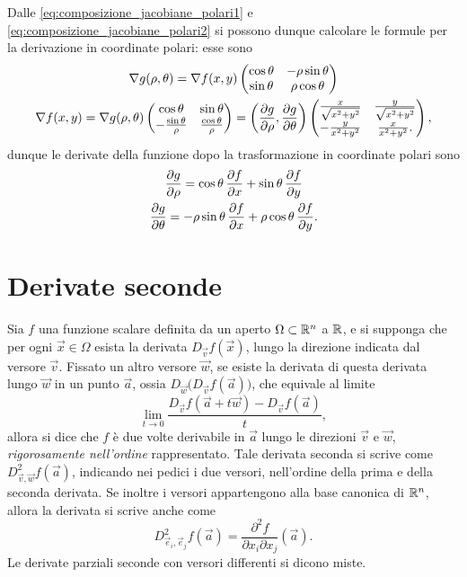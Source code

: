 Dalle \eqref{eq:composizione_jacobiane_polari1} e \eqref{eq:composizione_jacobiane_polari2} si possono dunque calcolare le formule per la derivazione in coordinate polari: esse sono
\begin{equation} \label{eq:jacobiane_polari}
\begin{gathered}
\nabla g(\rho,\theta)
=\nabla f(x,y)
	\begin{pmatrix}
	\cos\theta	&-\rho\sin\theta\\
	\sin\theta	&\rho\cos\theta
	\end{pmatrix}\\
\nabla f(x,y)
=\nabla g(\rho,\theta)
	\begin{pmatrix}
	\cos\theta			&\sin\theta\\
	-\frac{\sin\theta}{\rho}	&\frac{\cos\theta}{\rho}
	\end{pmatrix}
=\bigg(\frac{\partial {g}}{\partial {\rho}},\frac{\partial {g}}{\partial {\theta}}\bigg)
	\begin{pmatrix}
	\frac{x}{\sqrt{x^2+y^2}}	&\frac{y}{\sqrt{x^2+y^2}}\\
	-\frac{y}{x^2+y^2}		&\frac{x}{x^2+y^2}.
	\end{pmatrix},
\end{gathered}
\end{equation}
dunque le derivate della funzione dopo la trasformazione in coordinate polari sono
\begin{equation} \label{eq:derivate_polari}
\begin{gathered}
\frac{\partial {g}}{\partial {\rho}}=\cos\theta\,\frac{\partial {f}}{\partial {x}}+\sin\theta\,\frac{\partial {f}}{\partial {y}}\\
\frac{\partial {g}}{\partial {\theta}}=-\rho\sin\theta\,\frac{\partial {f}}{\partial {x}}+\rho\cos\theta\,\frac{\partial {f}}{\partial {y}}.
\end{gathered}
\end{equation}

\section{Derivate seconde}
Sia $f$ una funzione scalare definita da un aperto $\Omega\subset\mathbb{R}^n$ a $\mathbb{R}$, e si supponga che per ogni $\vec x\in\Omega$ esista la derivata $D_{\vec v}f(\vec x)$, lungo la direzione indicata dal versore $\vec v$. Fissato un altro versore $\vec w$, se esiste la derivata di questa derivata lungo $\vec w$ in un punto $\vec a$, ossia $D_{\vec w}\big(D_{\vec v}f(\vec a)\big)$, che equivale al limite
\[
\lim_{t\to 0}\frac{D_{\vec v}f(\vec a+t\vec w)-D_{\vec v}f(\vec a)}{t},
\]
allora si dice che $f$ è due volte derivabile in $\vec a$ lungo le direzioni $\vec v$ e $\vec w$, \emph{rigorosamente nell'ordine} rappresentato. Tale derivata seconda si scrive come $D^2_{\vec v,\vec w}f(\vec a)$, indicando nei pedici i due versori, nell'ordine della prima e della seconda derivata.
Se inoltre i versori appartengono alla base canonica di $\mathbb{R}^n$, allora la derivata si scrive anche come
\[
D^2_{\vec e_i,\vec e_j}f(\vec a)=\frac{\partial^2f}{\partial x_i\partial x_j}(\vec a).
\]
Le derivate parziali seconde con versori differenti si dicono miste.

